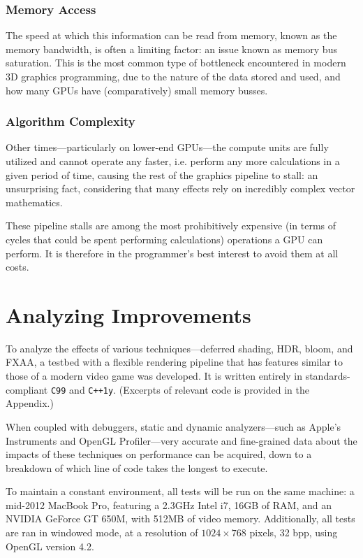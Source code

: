\documentclass[11pt, oneside]{report}
\begin{document}
\subsubsection{Memory Access}
The speed at which this information can be read from memory, known as the \gls{memory bandwidth}, is often a limiting factor: an issue known as memory bus saturation. This is the most common type of bottleneck encountered in modern 3D graphics programming, due to the nature of the data stored and used, and how many \glspl{GPU} have (comparatively) small memory busses.

\subsubsection{Algorithm Complexity}
Other times---particularly on lower-end \glspl{GPU}---the \glspl{compute unit} are fully utilized and cannot operate any faster, i.e. perform any more calculations in a given period of time, causing the rest of the \gls{graphics pipeline} to stall: an unsurprising fact, considering that many effects rely on incredibly complex vector mathematics.

These pipeline stalls are among the most prohibitively expensive (in terms of cycles that could be spent performing calculations) operations a \gls{GPU} can perform. It is therefore in the programmer's best interest to avoid them at all costs.

\section{Analyzing Improvements}
To analyze the effects of various techniques—\gls{deferred shading}, \gls{HDR}, \gls{bloom}, and \gls{FXAA}, a testbed with a flexible rendering pipeline that has features similar to those of a modern video game was developed. It is written entirely in standards-compliant \texttt{C99} and \texttt{C++1y}. (Excerpts of relevant code is provided in the Appendix.)

When coupled with debuggers, static and dynamic analyzers---such as Apple's Instruments and \gls{OpenGL} Profiler---very accurate and fine-grained data about the impacts of these techniques on performance can be acquired, down to a breakdown of which line of code takes the longest to execute.

To maintain a constant environment, all tests will be run on the same machine: a mid-2012 MacBook Pro, featuring a 2.3GHz Intel i7, 16GB of RAM, and an NVIDIA GeForce GT 650M, with 512MB of video memory. Additionally, all tests are ran in windowed mode, at a resolution of $1024 \times 768$ pixels, 32 \gls{bpp}, using \gls{OpenGL} version 4.2.
\end{document}
